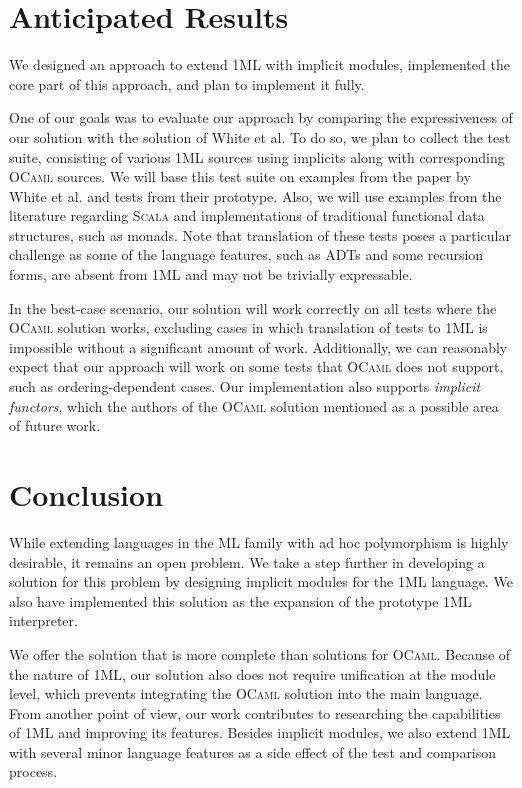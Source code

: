 \documentclass{spbau-diploma}
\begin{document}
\section{Anticipated Results}

We designed an approach to extend \textsc{1ML} with implicit modules, implemented the core part of this approach, and plan to implement it fully.

One of our goals was to evaluate our approach by comparing the expressiveness of our solution with the solution of White et al. To do so, we plan to collect the test suite, consisting of various \textsc{1ML} sources using implicits along with corresponding \textsc{OCaml} sources. We will base this test suite on examples from the paper by White et al. and tests from their prototype. Also, we will use examples from the literature regarding \textsc{Scala} and implementations of traditional functional data structures, such as monads. Note that translation of these tests poses a particular challenge as some of the language features, such as ADTs and some recursion forms, are absent from \textsc{1ML} and may not be trivially expressable. 

In the best-case scenario, our solution will work correctly on all tests where the \textsc{OCaml} solution works, excluding cases in which translation of tests to \textsc{1ML} is impossible without a significant amount of work. Additionally, we can reasonably expect that our approach will work on some tests that \textsc{OCaml} does not support, such as ordering-dependent cases. Our implementation also supports \textit{implicit functors}, which the authors of the \textsc{OCaml} solution mentioned as a possible area of future work.

\section*{Conclusion}

While extending languages in the \textsc{ML} family with ad hoc polymorphism is highly desirable, it remains an open problem. We take a step further in developing a solution for this problem by designing implicit modules for the \textsc{1ML} language. We also have implemented this solution as the expansion of the prototype \textsc{1ML} interpreter.

We offer the solution that is more complete than solutions for \textsc{OCaml}. Because of the nature of \textsc{1ML}, our solution also does not require unification at the module level, which prevents integrating the \textsc{OCaml} solution into the main language. From another point of view, our work contributes to researching the capabilities of \textsc{1ML} and improving its features. Besides implicit modules, we also extend \textsc{1ML} with several minor language features as a side effect of the test and comparison process. 
\end{document}
